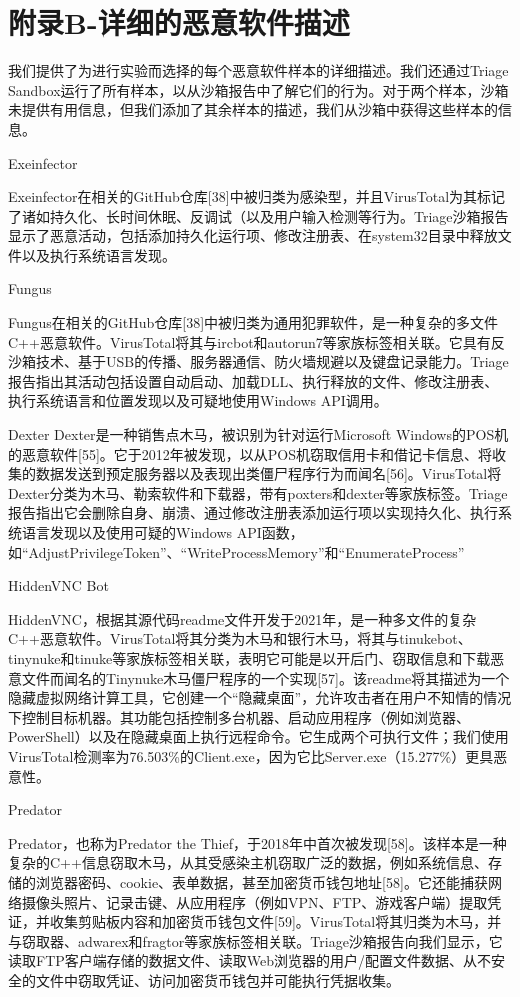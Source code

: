 \chapter{附录B-详细的恶意软件描述}
我们提供了为进行实验而选择的每个恶意软件样本的详细描述。我们还通过Triage Sandbox运行了所有样本，以从沙箱报告中了解它们的行为。对于两个样本，沙箱未提供有用信息，但我们添加了其余样本的描述，我们从沙箱中获得这些样本的信息。

Exeinfector

Exeinfector在相关的GitHub仓库[38]中被归类为感染型，并且VirusTotal为其标记了诸如持久化、长时间休眠、反调试（以及用户输入检测等行为。Triage沙箱报告显示了恶意活动，包括添加持久化运行项、修改注册表、在system32目录中释放文件以及执行系统语言发现。

Fungus

Fungus在相关的GitHub仓库[38]中被归类为通用犯罪软件，是一种复杂的多文件C++恶意软件。VirusTotal将其与ircbot和autorun7等家族标签相关联。它具有反沙箱技术、基于USB的传播、服务器通信、防火墙规避以及键盘记录能力。Triage报告指出其活动包括设置自动启动、加载DLL、执行释放的文件、修改注册表、执行系统语言和位置发现以及可疑地使用Windows API调用。

Dexter
Dexter是一种销售点木马，被识别为针对运行Microsoft Windows的POS机的恶意软件[55]。它于2012年被发现，以从POS机窃取信用卡和借记卡信息、将收集的数据发送到预定服务器以及表现出类僵尸程序行为而闻名[56]。VirusTotal将Dexter分类为木马、勒索软件和下载器，带有poxters和dexter等家族标签。Triage报告指出它会删除自身、崩溃、通过修改注册表添加运行项以实现持久化、执行系统语言发现以及使用可疑的Windows API函数，如“AdjustPrivilegeToken”、“WriteProcessMemory”和“EnumerateProcess”

HiddenVNC Bot

HiddenVNC，根据其源代码readme文件开发于2021年，是一种多文件的复杂C++恶意软件。VirusTotal将其分类为木马和银行木马，将其与tinukebot、tinynuke和tinuke等家族标签相关联，表明它可能是以开后门、窃取信息和下载恶意文件而闻名的Tinynuke木马僵尸程序的一个实现[57]。该readme将其描述为一个隐藏虚拟网络计算工具，它创建一个“隐藏桌面”，允许攻击者在用户不知情的情况下控制目标机器。其功能包括控制多台机器、启动应用程序（例如浏览器、PowerShell）以及在隐藏桌面上执行远程命令。它生成两个可执行文件；我们使用VirusTotal检测率为76.503\%的Client.exe，因为它比Server.exe（15.277\%）更具恶意性。

Predator

Predator，也称为Predator the Thief，于2018年中首次被发现[58]。该样本是一种复杂的C++信息窃取木马，从其受感染主机窃取广泛的数据，例如系统信息、存储的浏览器密码、cookie、表单数据，甚至加密货币钱包地址[58]。它还能捕获网络摄像头照片、记录击键、从应用程序（例如VPN、FTP、游戏客户端）提取凭证，并收集剪贴板内容和加密货币钱包文件[59]。VirusTotal将其归类为木马，并与窃取器、adwarex和fragtor等家族标签相关联。Triage沙箱报告向我们显示，它读取FTP客户端存储的数据文件、读取Web浏览器的用户/配置文件数据、从不安全的文件中窃取凭证、访问加密货币钱包并可能执行凭据收集。

